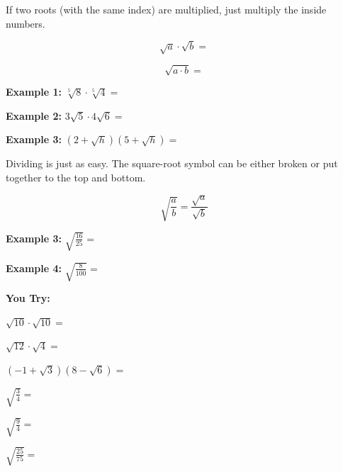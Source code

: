\documentclass[12pt]{article}
\begin{document}
If two roots (with the same index) are multiplied, just multiply the inside numbers. 

$$\sqrt{a} \cdot \sqrt{b} = $$

$$\sqrt{a \cdot b}= $$

\textbf{Example 1:} $\sqrt[5]{8} \cdot \sqrt[5]{4}=$\\

\vspace{.7cm}

\textbf{Example 2:} $3\sqrt{5} \cdot 4 \sqrt{6}=$\\

\vspace{.7cm}

\textbf{Example 3:} $(2+\sqrt{h})(5+\sqrt{h})=$\\

\vspace{.7cm}

\hrulefill

Dividing is just as easy. The square-root symbol can be either broken or put together to the top and bottom.
	
$$\sqrt{\frac{a}{b}}= \frac{\sqrt{a}}{\sqrt{b}}$$

\textbf{Example 3:} $\sqrt{\frac{16}{25}}=$

\vspace{.7cm}

\textbf{Example 4:} $\sqrt{\frac{8}{100}}=$

\vspace{.7cm}


\hrulefill

\textbf{You Try:}
\begin{enumerate}
\begin{multicols}{2}
\setlength\itemsep{1cm}

	\item $\sqrt{10} \cdot \sqrt{10}=$\\
	
	\item $\sqrt{12} \cdot \sqrt{4}=$\\
	
	\item $(-1 + \sqrt{3})(8 - \sqrt{6})=$\\
	
	\item $\sqrt{\frac{3}{4}}=$\\
	
	\item $\sqrt{\frac{9}{4}}=$\\
	
	\item $\sqrt{\frac{25}{75}}=$
\end{multicols}
\end{enumerate} 
\end{document}
